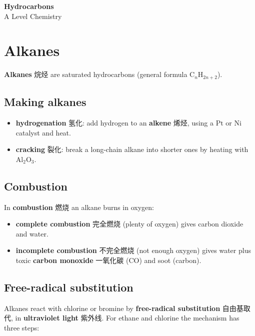 \documentclass[11pt]{article}
\begin{document}
\begin{center}
  {\LARGE\bfseries Hydrocarbons}\\[0.35em]
  {\large A Level Chemistry}
\end{center}
\vspace{0.6em}

\section*{Alkanes}

\textbf{Alkanes} 烷烃 are saturated hydrocarbons (general formula $\text{C}_n\text{H}_{2n+2}$).

\subsection*{Making alkanes}

\begin{itemize}
\item \textbf{hydrogenation} 氢化: add hydrogen to an \textbf{alkene} 烯烃, using a $\text{Pt}$ or $\text{Ni}$ catalyst and heat.

\item \textbf{cracking} 裂化: break a long-chain alkane into shorter ones by heating with $\text{Al}_2\text{O}_3$.

\end{itemize}

\subsection*{Combustion}

In \textbf{combustion} 燃烧 an alkane burns in oxygen:

\begin{itemize}
\item \textbf{complete combustion} 完全燃烧 (plenty of oxygen) gives carbon dioxide and water.

\item \textbf{incomplete combustion} 不完全燃烧 (not enough oxygen) gives water plus toxic \textbf{carbon monoxide} 一氧化碳 ($\text{CO}$) and soot (carbon).

\end{itemize}

\subsection*{Free-radical substitution}

Alkanes react with chlorine or bromine by \textbf{free-radical substitution} 自由基取代, in \textbf{ultraviolet light} 紫外线. For ethane and chlorine the mechanism has three steps:
\end{document}
